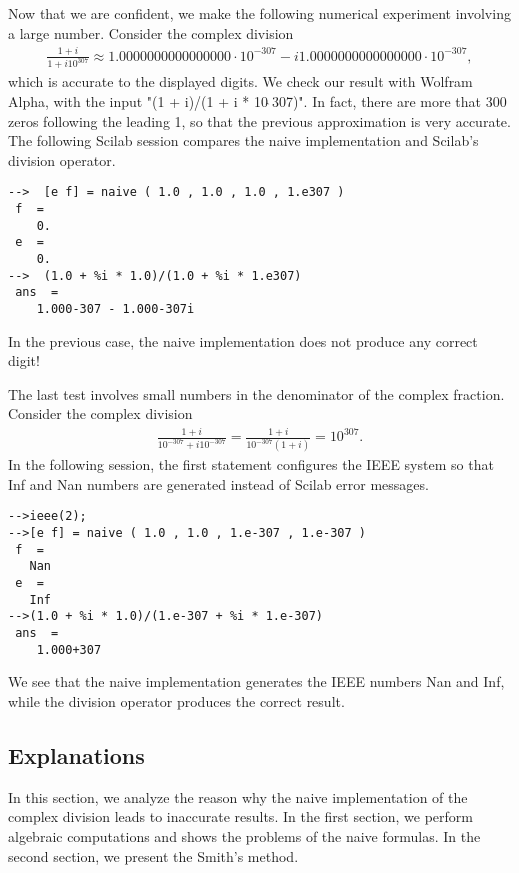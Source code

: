 Now that we are confident, we make the following numerical experiment involving 
a large number. Consider the complex division 
\begin{eqnarray}
\label{eq-cd-10307}
\frac{1 + i}{1 + i 10^{307}  } \approx 1.0000000000000000\cdot 10^{-307} - i 1.0000000000000000\cdot 10^{-307} ,
\end{eqnarray}
which is accurate to the displayed digits. 
We check our result with Wolfram Alpha\cite{WWWWolframAlpha}, with 
the input "(1 + i)/(1 + i * 10$\hat{\;}$307)".
In fact, there are more that 300 zeros following the leading 
1, so that the previous approximation is very accurate.
The following Scilab session compares the naive implementation and Scilab's division operator.
\lstset{language=scilabscript}
\begin{lstlisting}
-->  [e f] = naive ( 1.0 , 1.0 , 1.0 , 1.e307 )
 f  =
    0.  
 e  =
    0.  
-->  (1.0 + %i * 1.0)/(1.0 + %i * 1.e307)
 ans  =
    1.000-307 - 1.000-307i  
\end{lstlisting}
In the previous case, the naive implementation does not produce any correct digit!

The last test involves small numbers in the denominator of the complex fraction.
Consider the complex division 
\begin{eqnarray}
\label{eq-cd-thirdtest}
\frac{1 + i}{10^{-307} +  i 10^{-307} }= \frac{1 + i}{10^{-307}(1 +  i)} = 10^{307}.
\end{eqnarray}
In the following session, the first statement  configures the 
IEEE system so that Inf and Nan numbers are generated instead 
of Scilab error messages. 
\lstset{language=scilabscript}
\begin{lstlisting}
-->ieee(2);
-->[e f] = naive ( 1.0 , 1.0 , 1.e-307 , 1.e-307 )
 f  =
   Nan  
 e  =
   Inf  
-->(1.0 + %i * 1.0)/(1.e-307 + %i * 1.e-307)
 ans  =
    1.000+307  
\end{lstlisting}
We see that the naive implementation generates the IEEE numbers Nan and Inf, while the 
division operator produces the correct result.

\subsection{Explanations}

In this section, we analyze the reason why the naive implementation
of the complex division leads to inaccurate results.
In the first section, we perform algebraic computations 
and shows the problems of the naive formulas.
In the second section, we present the Smith's method.

